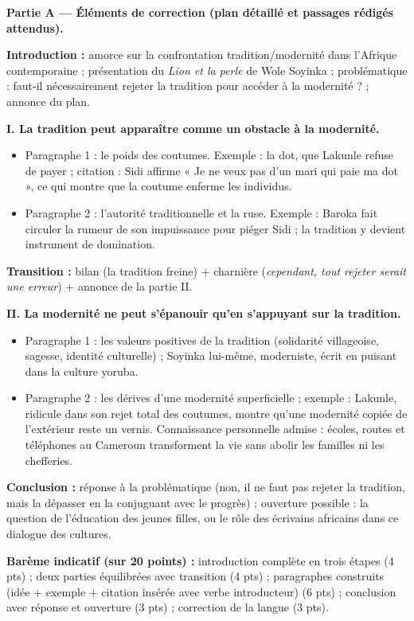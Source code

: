 \documentclass[11pt]{article}
\begin{document}
\begin{corrige}
\textbf{Partie A — Éléments de correction (plan détaillé et passages rédigés attendus).}

\textbf{Introduction :} amorce sur la confrontation tradition/modernité dans l'Afrique contemporaine ; présentation du \emph{Lion et la perle} de Wole Soyinka ; problématique : faut-il nécessairement rejeter la tradition pour accéder à la modernité ? ; annonce du plan.

\textbf{I. La tradition peut apparaître comme un obstacle à la modernité.}
\begin{itemize}
\item Paragraphe 1 : le poids des coutumes. Exemple : la dot, que Lakunle refuse de payer ; citation : Sidi affirme « Je ne veux pas d'un mari qui paie ma dot », ce qui montre que la coutume enferme les individus.
\item Paragraphe 2 : l'autorité traditionnelle et la ruse. Exemple : Baroka fait circuler la rumeur de son impuissance pour piéger Sidi ; la tradition y devient instrument de domination.
\end{itemize}

\textbf{Transition :} bilan (la tradition freine) + charnière (\emph{cependant, tout rejeter serait une erreur}) + annonce de la partie II.

\textbf{II. La modernité ne peut s'épanouir qu'en s'appuyant sur la tradition.}
\begin{itemize}
\item Paragraphe 1 : les valeurs positives de la tradition (solidarité villageoise, sagesse, identité culturelle) ; Soyinka lui-même, moderniste, écrit en puisant dans la culture yoruba.
\item Paragraphe 2 : les dérives d'une modernité superficielle ; exemple : Lakunle, ridicule dans son rejet total des coutumes, montre qu'une modernité copiée de l'extérieur reste un vernis. Connaissance personnelle admise : écoles, routes et téléphones au Cameroun transforment la vie sans abolir les familles ni les chefferies.
\end{itemize}

\textbf{Conclusion :} réponse à la problématique (non, il ne faut pas rejeter la tradition, mais la dépasser en la conjuguant avec le progrès) ; ouverture possible : la question de l'éducation des jeunes filles, ou le rôle des écrivains africains dans ce dialogue des cultures.

\textbf{Barème indicatif (sur 20 points) :} introduction complète en trois étapes (4 pts) ; deux parties équilibrées avec transition (4 pts) ; paragraphes construits (idée + exemple + citation insérée avec verbe introducteur) (6 pts) ; conclusion avec réponse et ouverture (3 pts) ; correction de la langue (3 pts).


\end{corrige}
\end{document}
